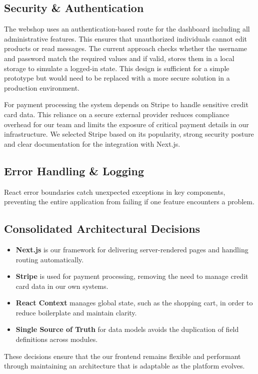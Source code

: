\subsection{Security \& Authentication}
The webshop uses an authentication-based route for the dashboard including all administrative features. This ensures that unauthorized individuals cannot edit products or read messages. The current approach checks whether the username and password match the required values and if valid, stores them in a local storage to simulate a logged-in state. This design is sufficient for a simple prototype but would need to be replaced with a more secure solution in a production environment.

For payment processing the system depends on Stripe to handle sensitive credit card data. This reliance on a secure external provider reduces compliance overhead for our team and limits the exposure of critical payment details in our infrastructure. We selected Stripe based on its popularity, strong security posture and clear documentation for the integration with Next.js. 

\subsection{Error Handling \& Logging}
React error boundaries catch unexpected exceptions in key components, preventing the entire application from failing if one feature encounters a problem. 

\subsection{Consolidated Architectural Decisions}
\begin{itemize}
  \item \textbf{Next.js} is our framework for delivering server-rendered pages and handling routing automatically.
  \item \textbf{Stripe} is used for payment processing, removing the need to manage credit card data in our own systems.
  \item \textbf{React Context} manages global state, such as the shopping cart, in order to reduce boilerplate and maintain clarity.
  \item \textbf{Single Source of Truth} for data models avoids the duplication of field definitions across modules.
\end{itemize}

These decisions ensure that the our frontend remains flexible and performant through maintaining an architecture that is adaptable as the platform evolves.